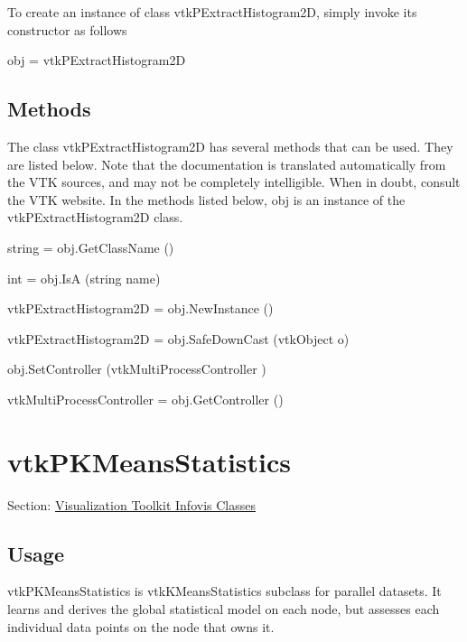 To create an instance of class vtk\-P\-Extract\-Histogram2\-D, simply invoke its constructor as follows \begin{DoxyVerb}  obj = vtkPExtractHistogram2D
\end{DoxyVerb}
 \hypertarget{vtkwidgets_vtkxyplotwidget_Methods}{}\subsection{Methods}\label{vtkwidgets_vtkxyplotwidget_Methods}
The class vtk\-P\-Extract\-Histogram2\-D has several methods that can be used. They are listed below. Note that the documentation is translated automatically from the V\-T\-K sources, and may not be completely intelligible. When in doubt, consult the V\-T\-K website. In the methods listed below, {\ttfamily obj} is an instance of the vtk\-P\-Extract\-Histogram2\-D class. 
\begin{DoxyItemize}
\item {\ttfamily string = obj.\-Get\-Class\-Name ()}  
\item {\ttfamily int = obj.\-Is\-A (string name)}  
\item {\ttfamily vtk\-P\-Extract\-Histogram2\-D = obj.\-New\-Instance ()}  
\item {\ttfamily vtk\-P\-Extract\-Histogram2\-D = obj.\-Safe\-Down\-Cast (vtk\-Object o)}  
\item {\ttfamily obj.\-Set\-Controller (vtk\-Multi\-Process\-Controller )}  
\item {\ttfamily vtk\-Multi\-Process\-Controller = obj.\-Get\-Controller ()}  
\end{DoxyItemize}\hypertarget{vtkinfovis_vtkpkmeansstatistics}{}\section{vtk\-P\-K\-Means\-Statistics}\label{vtkinfovis_vtkpkmeansstatistics}
Section\-: \hyperlink{sec_vtkinfovis}{Visualization Toolkit Infovis Classes} \hypertarget{vtkwidgets_vtkxyplotwidget_Usage}{}\subsection{Usage}\label{vtkwidgets_vtkxyplotwidget_Usage}
vtk\-P\-K\-Means\-Statistics is vtk\-K\-Means\-Statistics subclass for parallel datasets. It learns and derives the global statistical model on each node, but assesses each individual data points on the node that owns it.

